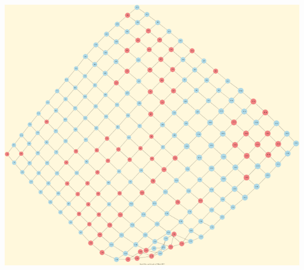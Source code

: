 \documentclass[letterpaper,10pt,english]{sphinxmanual}
\begin{document}
{\hfill\includegraphics{grid-15-15-ising.png}\hfill}
\end{document}
